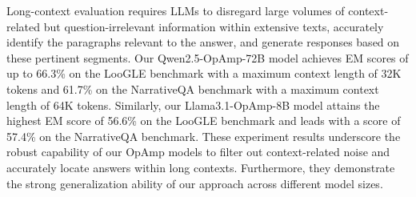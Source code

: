 Long-context evaluation requires LLMs to disregard large volumes of context-related but question-irrelevant information within extensive texts, accurately identify the paragraphs relevant to the answer, and generate responses based on these pertinent segments. 
Our Qwen2.5-OpAmp-72B model achieves EM scores of up to 66.3\% on the LooGLE benchmark with a maximum context length of 32K tokens and 61.7\% on the NarrativeQA benchmark with a maximum context length of 64K tokens. 
Similarly, our Llama3.1-OpAmp-8B model attains the highest EM score of 56.6\% on the LooGLE benchmark and leads with a score of 57.4\% on the NarrativeQA benchmark. 
These experiment results underscore the robust capability of our OpAmp models to filter out context-related noise and accurately locate answers within long contexts. 
Furthermore, they demonstrate the strong generalization ability of our approach across different model sizes.

\begin{table}[tb!]
\centering
\setlength\tabcolsep{2.4pt}
\caption{Ablation studies on various benchmarks with different noise ratios using Llama3.1-8B-base as the base model.
We bold the highest scores.}
\label{table:ab_study_noise}
\end{table}

